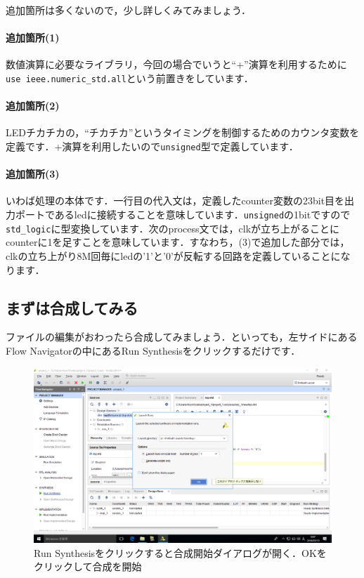 \documentclass[a4paper,dvipdfmx]{jsarticle}
\begin{document}
追加箇所は多くないので，少し詳しくみてみましょう．

\paragraph{追加箇所(1)}
数値演算に必要なライブラリ，今回の場合でいうと``+''演算を利用するために\verb|use ieee.numeric_std.all|という前置きをしています．

\paragraph{追加箇所(2)}
LEDチカチカの，``チカチカ''というタイミングを制御するためのカウンタ変数を定義です．+演算を利用したいので\verb|unsigned|型で定義しています．

\paragraph{追加箇所(3)}
いわば処理の本体です．一行目の代入文は，定義したcounter変数の23bit目を出力ポートであるledに接続することを意味しています．\verb|unsigned|の1bitですので\verb|std_logic|に型変換しています．次のprocess文では，clkが立ち上がることにcounterに1を足すことを意味しています．すなわち，(3)で追加した部分では，clkの立ち上がり8M回毎にledの'1'と'0'が反転する回路を定義していることになります．


\subsection{まずは合成してみる}
ファイルの編集がおわったら合成してみましょう．といっても，左サイドにあるFlow Navigatorの中にあるRun Synthesisをクリックするだけです．

 \begin{figure}[H]
  \begin{center}
   \includegraphics[width=.8\textwidth]{chapter03_figures/VirtualBox_Windows10_19_03_2018_00_07_02.png}
  \end{center}
  \caption{Run Synthesisをクリックすると合成開始ダイアログが開く．OKをクリックして合成を開始}
 \end{figure}
\end{document}
